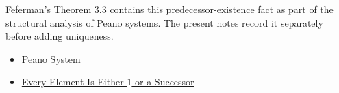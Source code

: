 \begin{remark*}
Feferman's Theorem 3.3 contains this predecessor-existence fact as part of the
structural analysis of Peano systems. The present notes record it separately
before adding uniqueness. \citet{FefermanNumberSystems1964}
\end{remark*}

\begin{dependencies}
\begin{itemize}
  \item \hyperref[def:peano-system]{Peano System}
  \item \hyperref[thm:every-element-is-one-or-a-successor]{Every Element Is Either $1$ or a Successor}
\end{itemize}
\end{dependencies}

